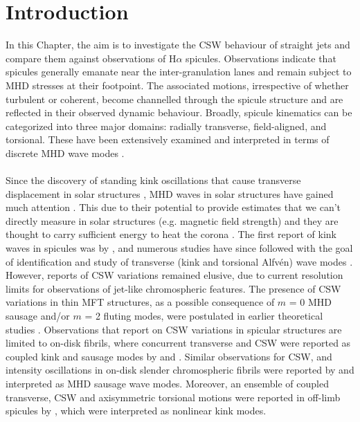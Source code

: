 \documentclass[12pt]{ociamthesis}
\newcommand{\Alfven}{Alfv\'{e}n}
\newcommand{\np}{\\ \\}
\begin{document}
\section{Introduction}
In this Chapter, the aim is to investigate the CSW behaviour of straight jets and compare them against observations of H$\alpha$ spicules. Observations indicate that spicules generally emanate near the inter-granulation lanes and remain subject to MHD stresses at their footpoint. The associated motions, irrespective of whether turbulent or coherent, become channelled through the spicule structure and are reflected in their observed dynamic behaviour. Broadly, spicule kinematics can be categorized into three major domains: radially transverse, field-aligned, and torsional. These have been extensively examined and interpreted in terms of discrete MHD wave modes \citep[see review:][]{Zaqarashvili2009}. \np  
%
Since the discovery of standing kink oscillations that cause transverse displacement in solar structures \citep{Aschwanden1999ApJ520880A, Nakariakov1999Sci285862N, Aschwanden2002SoPh20699A}, MHD waves in solar structures have gained much attention \citep{Cally1985AuJPh38825C, Kudoh1999ApJ514493K, Fujimura2009ApJ7021443F, Zaqarashvili2009, Kuridze2012, Jess2012, Mooroogen2017AA607A46M, Allcock2019FrASS648A}. This due to their potential to provide estimates that we can't directly measure in solar structures (e.g. magnetic field strength) and they are thought to carry sufficient energy to heat the corona \citep{Alfv1947MNRAS107211A, Gordon1983ApJ266373G, Poedts2002ESASP505273P, Srivastava2017NatSR743147S}. The first report of kink waves in spicules was by \cite{Kukhianidze2006}, and numerous studies have since followed with the goal of identification and study of transverse (kink and torsional \Alfven) wave modes \citep{DePontieu2007, Ebadi2014, Pascoe2016AA585L6P, Sharma2017, Tiwari2019ApJ876106T}. However, reports of CSW variations remained elusive, due to current resolution limits for observations of jet-like chromospheric features. The presence of CSW variations in thin MFT structures, as a possible consequence of $m$ = 0 MHD sausage and/or $m$ = 2 fluting modes, were postulated in earlier theoretical studies \citep{Ziegler1997a, Ziegler1997, Ruderman2010}. Observations that report on CSW variations in spicular structures are limited to on-disk fibrils, where concurrent transverse and CSW were reported as coupled kink and sausage modes by \cite{Jess2012} and \cite{Morton2012}. Similar observations for CSW, and intensity oscillations in on-disk slender chromospheric fibrils were reported by \citet{Gafeira2017} and interpreted as MHD sausage wave modes. Moreover, an ensemble of coupled transverse, CSW and axisymmetric torsional motions were reported in off-limb spicules by \citet{Sharma2018}, which were interpreted as nonlinear kink modes. \np
\end{document}
